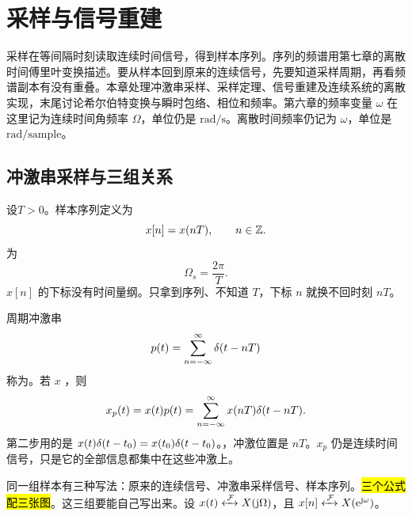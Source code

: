 \begingroup
\raggedbottom
\chapter{采样与信号重建}
\label{chap:sampling}

采样在等间隔时刻读取连续时间信号，得到样本序列。序列的频谱用第七章的离散时间傅里叶变换描述。要从样本回到原来的连续信号，先要知道采样周期，再看频谱副本有没有重叠。本章处理冲激串采样、采样定理、信号重建及连续系统的离散实现，末尾讨论希尔伯特变换与瞬时包络、相位和频率。第六章的频率变量 $\omega$ 在这里记为连续时间角频率 $\Omega$，单位仍是 $\mathrm{rad/s}$。离散时间频率仍记为 $\omega$，单位是 $\mathrm{rad/sample}$。

\section{冲激串采样与三组关系}
\label{sec:sampling-impulse}

设$T>0$。样本序列定义为
\begin{equation}
  x[n]=x(nT),\qquad n\in\mathbb{Z}.
  \label{eq:sampling-sequence}
\end{equation}
为
\begin{equation}
  \Omega_s=\frac{2\pi}{T}.
  \label{eq:sampling-frequency}
\end{equation}
$x[n]$ 的下标没有时间量纲。只拿到序列、不知道 $T$，下标 $n$ 就换不回时刻 $nT$。

周期冲激串
\[
  p(t)=\sum_{n=-\infty}^{\infty}\delta(t-nT)
\]
称为。若 $x$ ，则
\begin{equation}
  x_p(t)=x(t)p(t)
  =\sum_{n=-\infty}^{\infty}x(nT)\delta(t-nT).
  \label{eq:impulse-sampled-signal}
\end{equation}
第二步用的是 $x(t)\delta(t-t_0)=x(t_0)\delta(t-t_0)$。，冲激位置是 $nT$。$x_p$ 仍是连续时间信号，只是它的全部信息都集中在这些冲激上。

同一组样本有三种写法：原来的连续信号、冲激串采样信号、样本序列。\hl{三个公式配三张图}。这三组要能自己写出来。设 $x(t)\mathrel{\xleftrightarrow{\,\mathcal{F}\,}} X(\mathrm{j}\Omega)$，且 $x[n]\mathrel{\xleftrightarrow{\,\mathcal{F}\,}} X(\mathrm{e}^{\mathrm{j}\omega})$。

